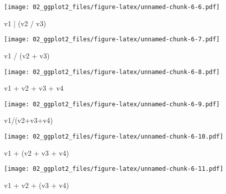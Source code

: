 \documentclass[
]{book}
\newenvironment{Shaded}{\begin{snugshade}}{\end{snugshade}}
\newcommand{\NormalTok}[1]{#1}
\newcommand{\SpecialCharTok}[1]{\textcolor[rgb]{0.00,0.00,0.00}{#1}}
\begin{document}
\texttt{[image: 02\_ggplot2\_files/figure-latex/unnamed-chunk-6-6.pdf]}

\begin{Shaded}
\begin{Highlighting}[]
\NormalTok{v1 }\SpecialCharTok{|}\NormalTok{ (v2 }\SpecialCharTok{/}\NormalTok{ v3)}
\end{Highlighting}
\end{Shaded}

\texttt{[image: 02\_ggplot2\_files/figure-latex/unnamed-chunk-6-7.pdf]}

\begin{Shaded}
\begin{Highlighting}[]
\NormalTok{v1 }\SpecialCharTok{/}\NormalTok{ (v2 }\SpecialCharTok{+}\NormalTok{ v3)}
\end{Highlighting}
\end{Shaded}

\texttt{[image: 02\_ggplot2\_files/figure-latex/unnamed-chunk-6-8.pdf]}

\begin{Shaded}
\begin{Highlighting}[]
\NormalTok{v1 }\SpecialCharTok{+}\NormalTok{ v2 }\SpecialCharTok{+}\NormalTok{ v3 }\SpecialCharTok{+}\NormalTok{ v4 }
\end{Highlighting}
\end{Shaded}

\texttt{[image: 02\_ggplot2\_files/figure-latex/unnamed-chunk-6-9.pdf]}

\begin{Shaded}
\begin{Highlighting}[]
\NormalTok{v1}\SpecialCharTok{/}\NormalTok{(v2}\SpecialCharTok{+}\NormalTok{v3}\SpecialCharTok{+}\NormalTok{v4)}
\end{Highlighting}
\end{Shaded}

\texttt{[image: 02\_ggplot2\_files/figure-latex/unnamed-chunk-6-10.pdf]}

\begin{Shaded}
\begin{Highlighting}[]
\NormalTok{v1  }\SpecialCharTok{+}\NormalTok{ (v2 }\SpecialCharTok{+}\NormalTok{ v3 }\SpecialCharTok{+}\NormalTok{ v4)}
\end{Highlighting}
\end{Shaded}

\texttt{[image: 02\_ggplot2\_files/figure-latex/unnamed-chunk-6-11.pdf]}

\begin{Shaded}
\begin{Highlighting}[]
\NormalTok{v1  }\SpecialCharTok{+}\NormalTok{ v2 }\SpecialCharTok{+}\NormalTok{ (v3 }\SpecialCharTok{+}\NormalTok{ v4)}
\end{Highlighting}
\end{Shaded}
\end{document}

